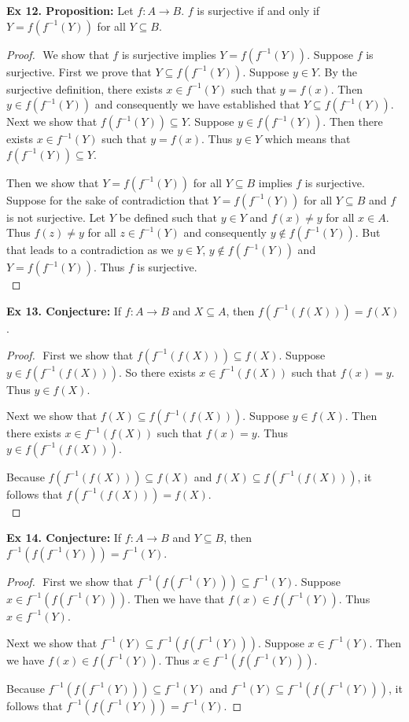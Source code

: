 \documentclass{article}
\begin{document}
\textbf{Ex 12. Proposition:} Let $f: A \rightarrow B$. $f$ is surjective if and only if $Y=f(f^{-1}(Y))$ for all $Y \subseteq B$.
\begin{proof}
$ $\newline
We show that $f$ is surjective implies $Y=f(f^{-1}(Y))$. Suppose $f$ is surjective. 
First we prove that $Y \subseteq f(f^{-1}(Y))$. Suppose $y \in Y$. By the surjective definition, there exists $x \in f^{-1}(Y)$ such that $y=f(x)$. Then $y \in f(f^{-1}(Y))$ and consequently we have established that $Y \subseteq f(f^{-1}(Y))$. Next we show that $f(f^{-1}(Y)) \subseteq Y$. Suppose $y \in f(f^{-1}(Y))$. Then there exists $x \in f^{-1}(Y)$ such that $y=f(x)$. Thus $y \in Y$ which means that $f(f^{-1}(Y)) \subseteq Y$.

Then we show that $Y=f(f^{-1}(Y))$ for all $Y \subseteq B$ implies $f$ is surjective. Suppose for the sake of contradiction that $Y=f(f^{-1}(Y))$ for all $Y \subseteq B$ and $f$ is not surjective. Let $Y$ be defined such that $y \in Y$ and $f(x) \neq y$ for all $x \in A$. Thus $f(z) \neq y$ for all $z \in f^{-1}(Y)$ and consequently $y \not\in f(f^{-1}(Y))$. But that leads to a contradiction as we $y \in Y$, $y \not\in f(f^{-1}(Y))$ and $Y=f(f^{-1}(Y))$. Thus $f$ is surjective.\\
\end{proof}

\textbf{Ex 13. Conjecture:} If $f: A \rightarrow B$ and $X \subseteq A$, then $f(f^{-1}(f(X)))=f(X)$.
\begin{proof}
$ $\newline
First we show that $f(f^{-1}(f(X))) \subseteq f(X)$. Suppose $y \in f(f^{-1}(f(X)))$. So there exists $x \in f^{-1}(f(X))$ such that $f(x)=y$. Thus $y \in f(X)$.

Next we show that $f(X) \subseteq f(f^{-1}(f(X)))$. Suppose $y \in f(X)$. Then there exists $x \in f^{-1}(f(X))$ such that $f(x)=y$. Thus $y \in f(f^{-1}(f(X)))$.

Because $f(f^{-1}(f(X))) \subseteq f(X)$ and $f(X) \subseteq f(f^{-1}(f(X)))$, it follows that $f(f^{-1}(f(X)))=f(X)$.\\
\end{proof}

\textbf{Ex 14. Conjecture:} If $f: A \rightarrow B$ and $Y \subseteq B$, then $f^{-1}(f(f^{-1}(Y)))=f^{-1}(Y)$.
\begin{proof}
$ $\newline
First we show that $f^{-1}(f(f^{-1}(Y))) \subseteq f^{-1}(Y)$. Suppose $x \in f^{-1}(f(f^{-1}(Y)))$.
Then we have that $f(x) \in f(f^{-1}(Y))$. Thus $x \in f^{-1}(Y)$.

Next we show that $f^{-1}(Y) \subseteq f^{-1}(f(f^{-1}(Y)))$. Suppose $x \in f^{-1}(Y)$. Then we have $f(x) \in f(f^{-1}(Y))$. Thus $x \in f^{-1}(f(f^{-1}(Y)))$.

Because $f^{-1}(f(f^{-1}(Y))) \subseteq f^{-1}(Y)$ and $f^{-1}(Y) \subseteq f^{-1}(f(f^{-1}(Y)))$, it follows that $f^{-1}(f(f^{-1}(Y)))=f^{-1}(Y)$.

\end{proof}
\end{document}
